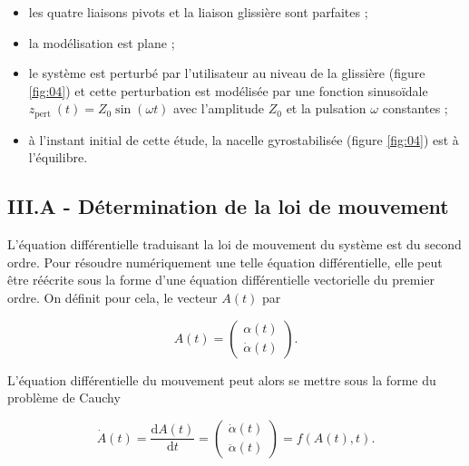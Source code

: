 \begin{itemize}
  \item les quatre liaisons pivots et la liaison glissière sont parfaites ;
  \item la modélisation est plane ;
  \item le système est perturbé par l'utilisateur au niveau de la glissière (figure \ref{fig:04}) et cette perturbation est modélisée par une fonction sinusoïdale $z_{\text {pert }}(t)=Z_{0} \sin (\omega t)$ avec l'amplitude $Z_{0}$ et la pulsation $\omega$ constantes ;
  \item à l'instant initial de cette étude, la nacelle gyrostabilisée (figure \ref{fig:04}) est à l'équilibre.
\end{itemize}

\subsection{III.A - Détermination de la loi de mouvement}
\ifprof
\begin{corrige}
\end{corrige}
\else
\fi

L'équation différentielle traduisant la loi de mouvement du système est du second ordre. Pour résoudre numériquement une telle équation différentielle, elle peut être réécrite sous la forme d'une équation différentielle vectorielle du premier ordre. On définit pour cela, le vecteur $A(t)$ par

$$
A(t)=\left(\begin{array}{c}
\alpha(t) \\
\dot{\alpha}(t)
\end{array}\right) .
$$

L'équation différentielle du mouvement peut alors se mettre sous la forme du problème de Cauchy

$$
\dot{A}(t)=\frac{\mathrm{d} A(t)}{\mathrm{d} t}=\left(\begin{array}{c}
\dot{\alpha}(t) \\
\ddot{\alpha}(t)
\end{array}\right)=f(A(t), t) .
$$

